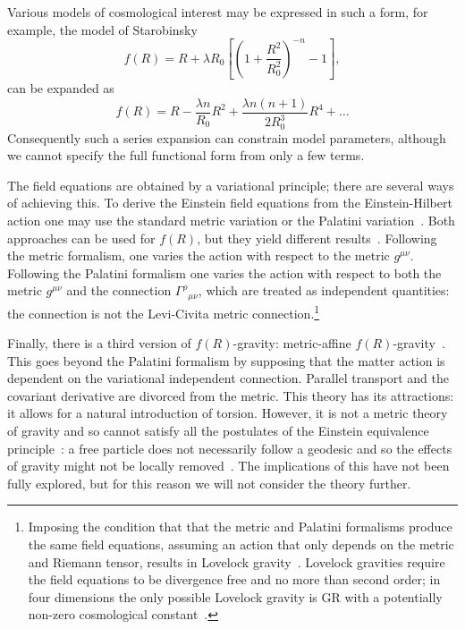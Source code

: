 Various models of cosmological interest may be expressed in such a form, for example, the model of Starobinsky~\cite{Starobinsky2007}
\begin{equation}
f(R) = R + \lambda R_0 \left[\left(1 + \frac{R^2}{R_0^2}\right)^{-n} - 1\right],
\end{equation}
can be expanded as
\begin{equation}
f(R) = R - \frac{\lambda n}{R_0} R^2 + \frac{\lambda n (n + 1)}{2 R_0^3} R^4 + \ldots
\end{equation}
Consequently such a series expansion can constrain model parameters, although we cannot specify the full functional form from only a few terms.

The field equations are obtained by a variational principle; there are several ways of achieving this. To derive the Einstein field equations from the Einstein-Hilbert action one may use the standard metric variation or the Palatini variation~\cite{Misner1973}. Both approaches can be used for $f(R)$, but they yield different results~\cite{Sotiriou2010, DeFelice2010}. Following the metric formalism, one varies the action with respect to the metric $g^{\mu\nu}$. Following the Palatini formalism one varies the action with respect to both the metric $g^{\mu\nu}$ and the connection ${\Gamma^\rho}_{\mu\nu}$, which are treated as independent quantities: the connection is not the Levi-Civita metric connection.\footnote{Imposing the condition that that the metric and Palatini formalisms produce the same field equations, assuming an action that only depends on the metric and Riemann tensor, results in Lovelock gravity~\cite{Exirifard2008}. Lovelock gravities require the field equations to be divergence free and no more than second order; in four dimensions the only possible Lovelock gravity is GR with a potentially non-zero cosmological constant~\cite{Lovelock1970, Lovelock1971, Lovelock1972}.}

Finally, there is a third version of $f(R)$-gravity: metric-affine $f(R)$-gravity~\cite{Sotiriou2007, Sotiriou2007b}. This goes beyond the Palatini formalism by supposing that the matter action is dependent on the variational independent connection. Parallel transport and the covariant derivative are divorced from the metric. This theory has its attractions: it allows for a natural introduction of torsion. However, it is not a metric theory of gravity and so cannot satisfy all the postulates of the Einstein equivalence principle~\cite{Will2006}: a free particle does not necessarily follow a geodesic and so the effects of gravity might not be locally removed~\cite{Exirifard2008}. The implications of this have not been fully explored, but for this reason we will not consider the theory further.

